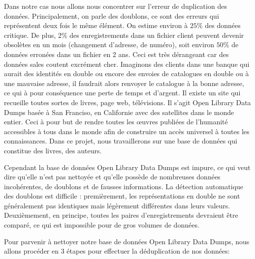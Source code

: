\documentclass[12pt, a4paper]{article}
\begin{document}
Dans notre cas nous allons nous concentrer sur l'erreur de duplication des données.
Principalement, on parle des doublons, ce sont des erreurs qui représentent deux fois le même élément.  On estime environ à $ 25\% $  des données critique.  De plus, $ 2\% $ des enregistrements dans un fichier client peuvent devenir obsolètes en un mois (changement d’adresse, de numéro), soit environ $50\%$ de données erronées dans un fichier en 2 ans. Ceci est très dérangeant car des données sales coutent excrément cher.
Imaginons des clients dans une banque qui aurait des identités en double ou encore des envoies de catalogues en double ou à une mauvaise adresse, il faudrait alors renvoyer le catalogue à la bonne adresse, ce qui à pour conséquence une perte de temps et d'argent.
Il existe un site qui recueille toutes sortes de livres, page web, télévisions. Il s’agit Open Library Data Dumps basée à San Franciso, en Californie avec des satellites dans le monde entier.  Ceci à pour but de rendre toutes les œuvres publiées de l’humanité accessibles à tous dans le monde afin de construire un accès universel à toutes les connaissances.
Dans ce projet, nous travaillerons sur une base de données qui constitue des livres, des auteurs.



  


Cependant la base de données Open Library Data Dumps est impure, ce qui veut dire qu’elle n’est pas nettoyée et qu’elle possède de nombreuses données incohérentes, de doublons et de fausses informations.
La détection automatique des doublons est difficile : premièrement, les représentations en double ne sont généralement pas identiques mais légèrement différentes dans leurs valeurs. Deuxièmement, en principe, toutes les paires d'enregistrements devraient être comparé, ce qui est impossible pour de gros volumes de données.



Pour parvenir à nettoyer notre base de données Open Library Data Dumps, nous allons procéder en 3 étapes pour effectuer la déduplication de nos données:
\end{document}
